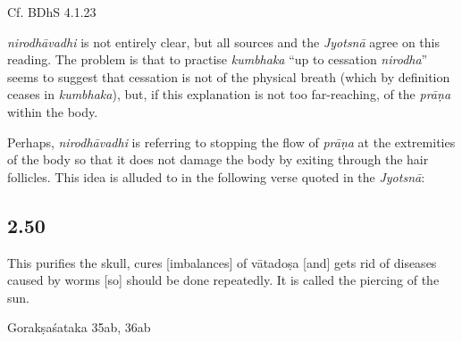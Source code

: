 \begin{ekdosis}
\begin{philcomm}[hp02_049]
Cf. BDhS 4.1.23
\begin{versinnote}
\end{versinnote}

\emph{nirodhāvadhi} is not entirely clear, but all sources and the \emph{Jyotsnā} agree on this reading. The problem is that to practise \emph{kumbhaka} ``up to cessation \emph{nirodha}'' seems to suggest that cessation is not of the physical breath (which by definition ceases in \emph{kumbhaka}), but, if this explanation is not too far-reaching, of the \emph{prāṇa} within the body.

Perhaps, \emph{nirodhāvadhi} is referring to stopping the flow of \emph{prāṇa} at the extremities of the body so that it does not damage the body by exiting through the hair follicles. This idea is alluded to in the following verse quoted in the \emph{Jyotsnā}:

\begin{versinnote}
\end{versinnote}
\end{philcomm}


\subsection*{2.50}
\begin{translation}[hp02_050]
This purifies the skull, cures [imbalances] of vātadoṣa [and] gets rid of diseases caused by worms [so] should be done repeatedly. It is called the piercing of the sun.
\end{translation}

\begin{sources}[hp02_050]
Gorakṣaśataka 35ab, 36ab

\begin{versinnote}
\end{versinnote}
\end{sources}


\end{ekdosis}
